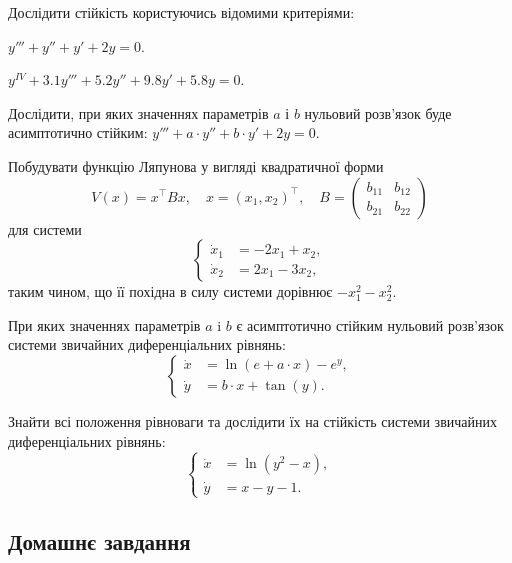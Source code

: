 Дослідити стійкість користуючись відомими критеріями:

\begin{problem}
	$y''' + y'' + y' + 2 y = 0$.
\end{problem}

\begin{problem}
	$y^{IV} + 3.1 y''' + 5.2 y'' + 9.8 y' + 5.8 y = 0$.
\end{problem}

\begin{problem}
	Дослідити, при яких значеннях параметрів $a$ і $b$ нульовий розв'язок буде асимптотично стійким: $y''' + a \cdot y'' + b \cdot y' + 2 y = 0$.
\end{problem}

\begin{problem}
	Побудувати функцію Ляпунова у вигляді квадратичної форми
	\[V(x) = x^\intercal B x, \quad x = (x_1, x_2)^\intercal, \quad B = \begin{pmatrix} b_{11} & b_{12} \\ b_{21} & b_{22} \end{pmatrix}\]
	для системи
	\[\left\{ \begin{aligned} \dot x_1 &= - 2 x_1 + x_2, \\ \dot x_2 &= 2 x_1 - 3 x_2, \end{aligned} \right.\]
	таким чином, що її похідна в силу системи дорівнює $-x_1^2 - x_2^2$.
\end{problem}

\begin{problem}
	При яких значеннях параметрів $a$ i $b$ є асимптотично стійким нульовий розв'язок системи звичайних диференціальних рівнянь:
	\[\left\{ \begin{aligned} \dot x &= \ln (e + a \cdot x) - e^y, \\ \dot y &= b \cdot x + \tan (y). \end{aligned} \right.\]
\end{problem}

\begin{problem}
	Знайти всі положення рівноваги та дослідити їх на стійкість системи звичайних диференціальних рівнянь:
	\[\left\{ \begin{aligned} \dot x &= \ln (y^2 - x), \\ \dot y &= x - y - 1. \end{aligned} \right.\]
\end{problem}

\subsection*{Домашнє завдання}


